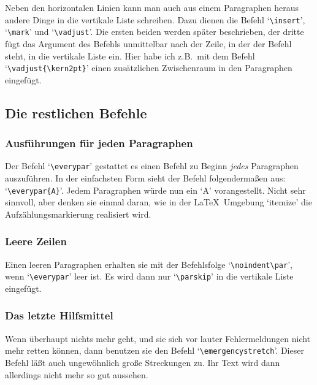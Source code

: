 Neben den 
horizontalen Linien kann man auch aus einem Paragraphen
heraus andere Dinge in die vertikale Liste schreiben. Dazu dienen die
Befehl 
`\verb|\insert|', 
`\verb|\mark|' und `\verb|\vadjust|'. Die
ersten beiden werden sp\"ater beschrieben, der dritte f\"ugt das
Argument
des Befehls unmittelbar nach der Zeile, in der der Befehl steht, in
die vertikale Liste ein. 
\vadjust{\kern2pt}Hier habe ich z.B.\ mit dem
Befehl `\verb|\vadjust{\kern2pt}|' einen zus\"atzlichen
Zwischenraum in
den Paragraphen eingef\"ugt.
\subsection{Die restlichen Befehle}
\subsubsection{Ausf\"uhrungen f\"ur jeden Paragraphen}
Der Befehl
`\verb|\everypar|' gestattet es einen Befehl zu Beginn {\em
jedes} Paragraphen auszuf\"uhren. In der einfachsten Form sieht der
Befehl folgenderma\ss{}en aus: `\verb|\everypar{A}|'. Jedem Paragraphen
w\"urde nun ein `A' vorangestellt. Nicht sehr sinnvoll, aber denken sie
einmal daran, wie in der \LaTeX\ Umgebung `itemize' die
Aufz\"ahlungsmarkierung realisiert wird.
\subsubsection{Leere Zeilen}
Einen leeren Paragraphen erhalten sie mit der Befehlsfolge
`\verb|\noindent\par|', wenn `\verb|\everypar|' leer ist. Es wird dann
nur 
`\verb|\parskip|' in die vertikale Liste eingef\"ugt.
\subsubsection{Das letzte Hilfsmittel}
Wenn \"uberhaupt nichts mehr geht, und sie sich vor lauter
Fehlermeldungen nicht mehr retten k\"onnen, dann benutzen sie den Befehl
`\verb|\emergencystretch|'. Dieser Befehl l\"a\ss{}t auch ungew\"ohnlich gro\ss{}e
Streckungen zu. Ihr Text wird dann allerdings nicht mehr so gut
aussehen.
